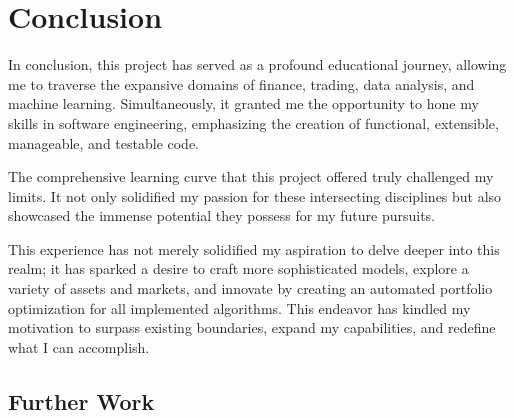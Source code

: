 \chapter{Conclusion}
In conclusion, this project has served as a profound educational journey, allowing me to traverse the expansive domains of finance, trading, data analysis, and machine learning. Simultaneously, it granted me the opportunity to hone my skills in software engineering, emphasizing the creation of functional, extensible, manageable, and testable code.

The comprehensive learning curve that this project offered truly challenged my limits. It not only solidified my passion for these intersecting disciplines but also showcased the immense potential they possess for my future pursuits.

This experience has not merely solidified my aspiration to delve deeper into this realm; it has sparked a desire to craft more sophisticated models, explore a variety of assets and markets, and innovate by creating an automated portfolio optimization for all implemented algorithms. This endeavor has kindled my motivation to surpass existing boundaries, expand my capabilities, and redefine what I can accomplish.
\section{Further Work}